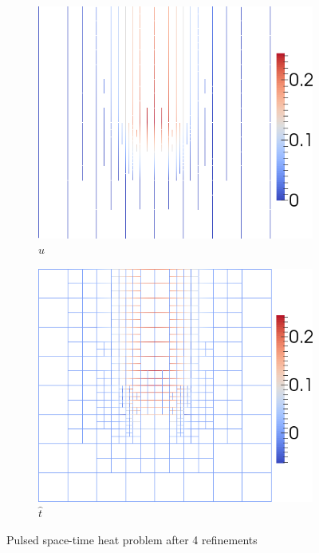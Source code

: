 \documentclass[preprint,12pt]{elsarticle}
\begin{document}
\begin{figure}[!ht]
\begin{subfigure}[t]{0.45\textwidth}
\end{subfigure}
\begin{subfigure}[t]{0.45\textwidth}
\centering
\includegraphics[width=\textwidth]{SpaceTimeHeat/PulseSource/uhat.png}
\caption{$\hat u$}
\label{fig:spaceTimeHeatuhat}
\end{subfigure}
\begin{subfigure}[t]{0.45\textwidth}
\centering
\includegraphics[width=\textwidth]{SpaceTimeHeat/PulseSource/fhat.png}
\caption{$\hat t$}
\label{fig:spaceTimeHeatfhat}
\end{subfigure}
\caption{Pulsed space-time heat problem after 4 refinements}
\label{fig:spaceTimeHeatPulse}
\end{figure}
\end{document}
